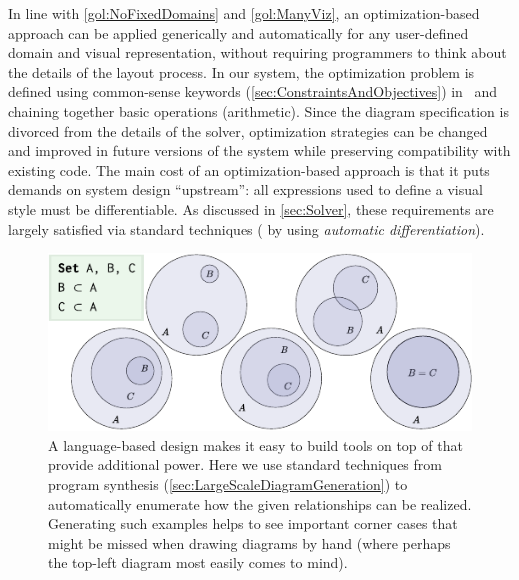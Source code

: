 In line with \ref{gol:NoFixedDomains} and \ref{gol:ManyViz}, an optimization-based approach can be applied generically and automatically for any user-defined domain and visual representation, without requiring programmers to think about the details of the layout process.  In our system, the optimization problem is defined using common-sense keywords (\cref{sec:ConstraintsAndObjectives}) in \Style\ and chaining together basic operations (\eg arithmetic).  Since the diagram specification is divorced from the details of the solver, optimization strategies can be changed and improved in future versions of the system while preserving compatibility with existing code.  The main cost of an optimization-based approach is that it puts demands on system design ``upstream'': all expressions used to define a visual style must be differentiable. As discussed in \cref{sec:Solver}, these requirements are largely satisfied via standard techniques (\eg{} by using \textit{automatic differentiation}).

\begin{figure}[t]
   \begin{minipage}[c]{.5\linewidth}
   \includegraphics{assets/penrose/enumeration.pdf}
   \end{minipage}\hfill
   \begin{minipage}[c]{.4\linewidth}
   \caption{A language-based design makes it easy to build tools on top of \Penrose{} that provide additional power. Here we use standard techniques from program synthesis (\cref{sec:LargeScaleDiagramGeneration}) to automatically enumerate how the given relationships can be realized.  Generating such examples helps to see important corner cases that might be missed when drawing diagrams by hand (where perhaps the top-left diagram most easily comes to mind).\label{fig:enumerate-subsets}}
   \end{minipage}
\end{figure}


